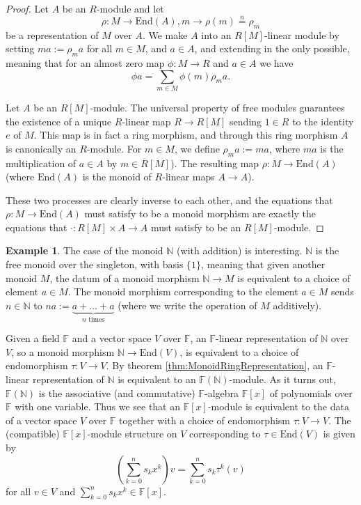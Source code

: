 \documentclass[a4paper,12pt,parskip=half*,chapterprefix=true,numbers=noendperiod]{scrreprt}
\theoremstyle{definition}
\newtheorem{example}{Example}[section]
\theoremstyle{remark}
\begin{document}
\begin{proof}
Let $A$ be an $R$-module and let
\begin{equation*}
	\rho:M\to\text{End}(A),m\to\rho(m)\overset{n}{=}\rho_m
\end{equation*}
be a representation of $M$ over $A$. We make $A$ into an $R[M]$-linear module by setting $ma:=\rho_ma$ for all $m\in M$, and $a\in A$, and extending in the only possible, meaning that for an almost zero map $\phi:M\to R$ and $a\in A$ we have
\begin{equation*}
	\phi a=\sum_{m\in M}\phi(m)\rho_ma.
\end{equation*}

Let $A$ be an $R[M]$-module. The universal property of free modules guarantees the existence of a unique $R$-linear map $R\to R[M]$ sending $1\in R$ to the identity $e$ of $M$. This map is in fact a ring morphism, and through this ring morphism $A$ is canonically an $R$-module. For $m\in M$, we define $\rho_ma:=ma$, where $ma$ is the multiplication of $a\in A$ by $m\in R[M]$). The resulting map $\rho:M\to\text{End}(A)$ (where $\text{End}(A)$ is the monoid of $R$-linear maps $A\to A$).

These two processes are clearly inverse to each other, and the equations that $\rho:M\to\text{End}(A)$ must satisfy to be a monoid morphism are exactly the equations that $\cdot:R[M]\times A\to A$ must satisfy to be an $R[M]$-module.
\end{proof}

\begin{example}
	The case of the monoid $\mathbb{N}$ (with addition) is interesting. $\mathbb{N}$ is the free monoid over the singleton, with basis $\{1\}$, meaning that given another monoid $M$, the datum of a monoid morphism $\mathbb{N}\to M$ is equivalent to a choice of element $a\in M$. The monoid morphism corresponding to the element $a\in M$ sends $n\in\mathbb{N}$ to $na:=\underbrace{a+...+a}_{n\text{ times}}$ (where we write the operation of $M$ additively). 
	
Given a field $\mathbb{F}$ and a vector space $V$ over $\mathbb{F}$, an $\mathbb{F}$-linear representation of $\mathbb{N}$ over $V$, so a monoid morphism $\mathbb{N}\to\text{End}(V)$, is equivalent to a choice of endomorphism $\tau:V\to V$. By theorem \ref{thm:MonoidRingRepresentation}, an $\mathbb{F}$-linear representation of $\mathbb{N}$ is equivalent to an $\mathbb{F}(\mathbb{N})$-module. As it turns out, $\mathbb{F}(\mathbb{N})$ is the associative (and commutative) $\mathbb{F}$-algebra $\mathbb{F}[x]$ of polynomials over $\mathbb{F}$ with one variable. Thus we see that an $\mathbb{F}[x]$-module is equivalent to the data of a vector space $V$ over $\mathbb{F}$ together with a choice of endomorphism $\tau:V\to V$. The (compatible) $\mathbb{F}[x]$-module structure on $V$ corresponding to $\tau\in\text{End}(V)$ is given by
\begin{equation*}
(\sum_{k=0}^ns_kx^k)v=\sum_{k=0}^ns_k\tau^k(v)
\end{equation*}
for all $v\in V$ and $\sum_{k=0}^ns_kx^k\in\mathbb{F}[x]$.
\end{example}

\printbibliography
\end{document}
